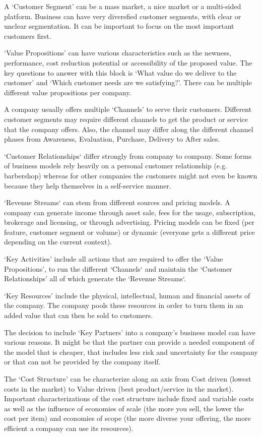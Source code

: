 		A `Customer Segment' can be a mass market, a nice market or a multi-sided platform. Business can have very diversfied customer segments, with clear or unclear segmentation. It can be important to focus on the most important customers first.

		`Value Propositions' can have various characteristics such as the newness, performance, cost reduction potential or accessibility of the proposed value. The key questions to answer with this block is `What value do we deliver to the customer' and `Which customer needs are we satisfying?'. There can be multiple different value propositions per company.

		A company usually offers multiple `Channels' to serve their customers. Different customer segments may require different channels to get the product or service that the company offers. Also, the channel may differ along the different channel phases from Awareness, Evaluation, Purchase, Delivery to After sales.

		`Customer Relationships` differ strongly from company to company. Some forms of business models rely heavily on a personal customer relationship (e.g. barbershop) whereas for other companies the customers might not even be known because they help themselves in a self-service manner.

		`Revenue Streams` can stem from different sources and pricing models. A company can generate income through asset sale, fees for the usage, subscription, brokerage and licensing, or through advertising. Pricing models can be fixed (per feature, customer segment or volume) or dynamic (everyone gets a different price depending on the current context).
 
		`Key Activities' include all actions that are required to offer the `Value Propositions', to run the different `Channels` and maintain the `Customer Relationships' all of which generate the `Revenue Streams`.

		`Key Resources' include the physical, intellectual, human and financial assets of the company. The company pools these resources in order to turn them in an added value that can then be sold to customers.

		The decision to include `Key Partners' into a company's business model can have various reasons. It might be that the partner can provide a needed component of the model that is cheaper, that includes less risk and uncertainty for the company or that can not be provided by the company itself.

		The `Cost Structure' can be characterize along an axis from Cost driven (lowest costs in the market) to Value driven (best product/service in the market). Important characterizations of the cost structure include fixed and variable costs as well as the influence of economies of scale (the more you sell, the lower the cost per item) and economies of scope (the more diverse your offering, the more efficient a company can use its resources).	

